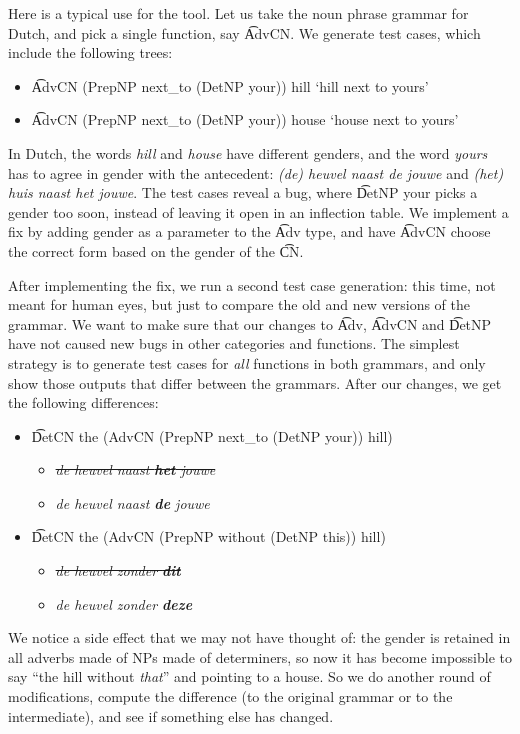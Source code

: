 Here is a typical use for the tool. 
Let us take the noun phrase grammar for Dutch, and pick a single function,
say \t{AdvCN}. We generate test cases, which include the following
trees: 
\begin{itemize}
\item \t{AdvCN (PrepNP next\_to (DetNP your)) hill} `hill next to
yours'
\item \t{AdvCN (PrepNP next\_to (DetNP your)) house} `house next
to yours'
\end{itemize}
In Dutch, the words \emph{hill} and \emph{house} have different
genders, and the word \emph{yours} has to agree in gender 
with the antecedent: \emph{(de) heuvel naast de jouwe} and \emph{(het)
  huis naast het jouwe}. The test cases reveal a bug, where \t{DetNP your} 
picks a gender too soon, instead of leaving it open in an inflection
table. We implement a fix by adding gender as a parameter to the
\t{Adv} type, and have \t{AdvCN} choose the correct form based on the gender of the \t{CN}. 

After implementing the fix, we run a second test case generation: this
time, not meant for human eyes, but just to compare the old and new
versions of the grammar. We want to make sure that our changes 
to \t{Adv}, \t{AdvCN} and \t{DetNP} 
have not caused new bugs in other categories and functions. The
simplest strategy is to generate test cases for \emph{all} functions
in both grammars, and only show those outputs that differ between the
grammars. After our changes, we get the following differences: 

\begin{itemize}
\item \t{DetCN the (AdvCN (PrepNP next\_to (DetNP your)) hill)}
  \begin{itemize}
   \item \emph{\sout{de heuvel naast {\bf  het} jouwe}}
   \item \emph{de heuvel naast {\bf  de} jouwe}
  \end{itemize}
\item \t{DetCN the (AdvCN (PrepNP without (DetNP this)) hill)}
  \begin{itemize}
   \item \emph{\sout{de heuvel zonder {\bf  dit}}}
   \item \emph{de heuvel zonder {\bf  deze}}
  \end{itemize}
\end{itemize}

\noindent We notice a side effect that we may not have thought of: the
gender is retained in all adverbs made of NPs made of determiners, so
now it has become impossible to say ``the hill without \emph{that}'' and
pointing to a house. So we do another round of modifications, compute
the difference (to the original grammar or to the intermediate), and
see if something else has changed.


